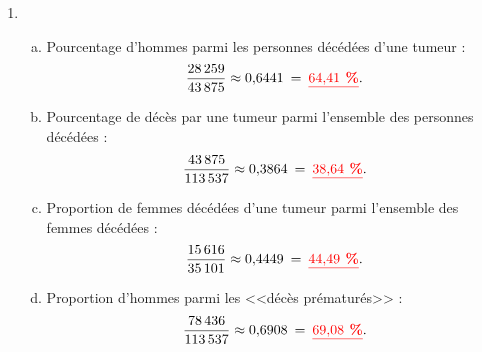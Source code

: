 \documentclass[xcolor={dvipsnames}]{beamer}
\begin{document}
\begin{frame}
	\begin{enumerate}
		\item \begin{enumerate}[a)]
			\item Pourcentage d'hommes parmi les personnes décédées d'une tumeur :\pause
			\begin{equation*}
				\dfrac{\num{28259}}{\num{43875}} \approx \num{0.6441} \: = \: \textcolor{red}{\underline{\textbf{\num{64.41} \%}}}.
			\end{equation*} \pause
			
			\item Pourcentage de décès par une tumeur parmi l'ensemble des personnes décédées :\pause
			\begin{equation*}
				\dfrac{\num{43875}}{\num{113537}} \approx \num{0.3864}\: = \: \textcolor{red}{\underline{\textbf{\num{38.64} \%}}}.
			\end{equation*}\pause
			
			\item Proportion de femmes décédées d'une tumeur parmi l'ensemble des femmes décédées :\pause
			\begin{equation*}
				\dfrac{\num{15616}}{\num{35101}} \approx \num{0.4449} \: = \: \textcolor{red}{\underline{\textbf{\num{44.49} \%}}}.
			\end{equation*}\pause
			
			\item Proportion d'hommes parmi les <<décès prématurés>> :\pause
			\begin{equation*}
				\dfrac{\num{78436}}{\num{113537}} \approx \num{0.6908} \: = \: \textcolor{red}{\underline{\textbf{\num{69.08} \%}}}.
			\end{equation*}
		\end{enumerate}
	\end{enumerate}
\end{frame}
\end{document}
